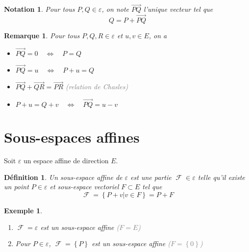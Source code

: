 \documentclass[a4paper, oneside]{report}
\theoremstyle{break}
\newtheorem{definition}[thm]{Définition}
\newtheorem{notation}[thm]{Notation}
\newtheorem{exemple}[thm]{Exemple}
\newtheorem{remarque}[thm]{Remarque}
\newcommand{\gray}[1]{\textcolor{gray}{#1}}
\DeclareMathOperator{\F}{\mathcal{F}}
\DeclarePairedDelimiter\ens{\left\{ }{\right\} }%
\renewcommand{\ens}[1]{\left\{ #1 \right\} }%
\newcommand{\Ens}{\ens}
\newcommand{\ensF}{\F}
\begin{document}
\begin{notation}
Pour tous $P, Q \in \varepsilon$, on note $\vec{PQ}$ l'unique vecteur tel que
\[
Q = P + \vec{PQ}
\]
\end{notation}

\begin{remarque}
Pour tous $P, Q, R \in \varepsilon$ et $u, v \in E$, on a
\begin{itemize}[label=$\bullet$]
\item $\vec{PQ} = 0		\quad	\Leftrightarrow	\quad		P = Q$

\item $\vec{PQ} = u		\quad	\Leftrightarrow	\quad		P + u = Q$

\item $\vec{PQ} + \vec{QR} = \vec{PR}$
\newline
\gray{(relation de Chasles)}

\item $P + u = Q + v		\quad	\Leftrightarrow	\quad		\vec{PQ} = u - v$
\end{itemize}
\end{remarque}

\section{Sous-espaces affines}

Soit $\varepsilon$ un espace affine de direction $E$.

\begin{definition}
Un sous-espace affine de $\varepsilon$ est une partie $\ensF \in \varepsilon$ telle qu'il existe un point $P \in \varepsilon$ et sous-espace vectoriel $F \subset E$ tel que
\[
\ensF = \Ens{P + v \big| v \in F} = P + F
\]
\end{definition}

\begin{exemple}
\begin{enumerate}
\item  $\ensF = \varepsilon$ est un sous-espace affine \gray{($F = E$)}

\medbreak

\item  Pour $P \in \varepsilon$, $\ensF = \ens{P}$ est un sous-espace affine \gray{($F = \ens{0}$)}
\end{enumerate}
\end{exemple}
\end{document}
